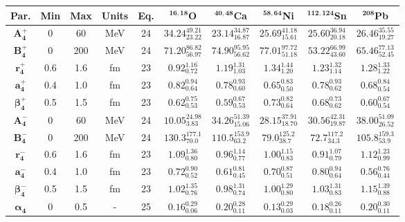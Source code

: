 \bgroup
\def\arraystretch{1.5}%
\begin{tabular}{ c c c c c c c c c c} 
\textbf{Par.} & \textbf{Min} & \textbf{Max} &                \textbf{Units} & \textbf{Eq.}& \textbf{$\mathbf{^{16,18}}$O}& \textbf{$\mathbf{^{40,48}}$Ca}& \textbf{$\mathbf{^{58,64}}$Ni}& \textbf{$\mathbf{^{112,124}}$Sn}& \textbf{$\mathbf{^{208}}$Pb}\\
 \hline 
$\mathbf{A_{4}^{+}}$ & 0 & 60 & MeV & 24 & $34.24^{49.21}_{23.22}$ & $23.14^{34.87}_{16.87}$ & $25.69^{41.18}_{15.61}$ & $25.60^{36.94}_{20.18}$ & $26.46^{35.55}_{19.27}$\\ 
$\mathbf{B_{4}^{+}}$ & 0 & 200 & MeV & 24 & $71.20^{86.82}_{56.97}$ & $74.90^{95.95}_{56.62}$ & $77.01^{97.72}_{51.18}$ & $53.22^{66.99}_{43.60}$ & $65.46^{77.13}_{52.45}$\\ 
$\mathbf{r_{4}^{+}}$ & 0.6 & 1.6 & fm & 23 & $0.92^{1.16}_{0.72}$ & $1.19^{1.31}_{1.03}$ & $1.34^{1.44}_{1.20}$ & $1.23^{1.32}_{1.14}$ & $1.28^{1.33}_{1.22}$\\ 
$\mathbf{a_{4}^{+}}$ & 0.4 & 1.0 & fm & 23 & $0.82^{0.94}_{0.64}$ & $0.78^{0.93}_{0.60}$ & $0.65^{0.83}_{0.50}$ & $0.78^{0.93}_{0.62}$ & $0.68^{0.84}_{0.54}$\\ 
$\mathbf{\beta_{4}^{+}}$ & 0.5 & 1.5 & fm & 23 & $0.62^{0.75}_{0.53}$ & $0.59^{0.67}_{0.53}$ & $0.73^{0.82}_{0.64}$ & $0.68^{0.73}_{0.62}$ & $0.60^{0.67}_{0.54}$\\ 
$\mathbf{A_{4}^{-}}$ & 0 & 60 & MeV & 24 & $10.05^{24.98}_{3.83}$ & $34.26^{51.39}_{15.06}$ & $28.15^{37.91}_{18.70}$ & $30.56^{42.31}_{19.87}$ & $38.00^{51.09}_{26.52}$\\ 
$\mathbf{B_{4}^{-}}$ & 0 & 200 & MeV & 24 & $130.3^{177.1}_{70.0}$ & $110.5^{153.9}_{63.2}$ & $79.0^{125.2}_{38.7}$ & $72.7^{117.2}_{34.3}$ & $105.8^{159.3}_{53.9}$\\ 
$\mathbf{r_{4}^{-}}$ & 0.6 & 1.6 & fm & 23 & $1.09^{1.36}_{0.80}$ & $0.96^{1.14}_{0.77}$ & $1.00^{1.15}_{0.83}$ & $0.91^{1.07}_{0.79}$ & $1.12^{1.23}_{0.99}$\\ 
$\mathbf{a_{4}^{-}}$ & 0.4 & 1.0 & fm & 23 & $0.72^{0.90}_{0.52}$ & $0.61^{0.81}_{0.45}$ & $0.70^{0.87}_{0.51}$ & $0.80^{0.94}_{0.64}$ & $0.56^{0.76}_{0.44}$\\ 
$\mathbf{\beta_{4}^{-}}$ & 0.5 & 1.5 & fm & 23 & $1.02^{1.35}_{0.76}$ & $0.98^{1.31}_{0.74}$ & $1.00^{1.29}_{0.80}$ & $1.03^{1.31}_{0.83}$ & $1.15^{1.39}_{0.88}$\\ 
$\mathbf{\alpha_{4}}$ & 0 & 0.5 & - & 25 & $0.16^{0.29}_{0.06}$ & $0.20^{0.28}_{0.11}$ & $0.13^{0.29}_{0.03}$ & $0.18^{0.26}_{0.11}$ & $0.20^{0.30}_{0.11}$\\ 

\end{tabular}
